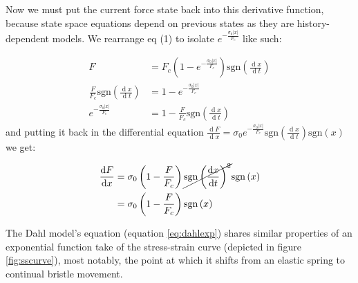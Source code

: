 \documentclass[12pt]{article}
\newcommand{\diff}{\ensuremath{\operatorname{d}\!}}
\begin{document}
\noindent
Now we must put the current force state back into this derivative function, because state space equations depend on previous states as they are history-dependent models. We rearrange eq (1) to isolate $e^{-\frac{\sigma_{0}|x|}{F_{c}}}$ like such:

\begin{align}
    F&=F_{c}\left(1-e^{-\frac{ \sigma_{0}|x| }{ F_{c} }}\right)\mathrm{sgn}\left(\frac{\diff x}{\diff t}\right) \\
    \frac{F}{F_{c}} \mathrm{sgn}\left(\frac{\diff x}{\diff t}\right) &= 1-e^{-\frac{\sigma_{0}|x|}{F_{c}}} \\
    e^{-\frac{\sigma_{0}|x|}{F_{c}}} &= 1 - \frac{F}{F_{c}} \mathrm{sgn}\left(\frac{\diff x}{\diff t}\right)
\end{align}
and putting it back in the differential equation $\frac{\diff F}{\diff x} = \sigma_{0}e^{-\frac{\sigma_{0}|x|}{F_{c}}}\mathrm{sgn}\left(\frac{\diff x}{\diff t}\right)\mathrm{sgn}\left(x\right)$ we get:

\begin{align}
    \frac{\diff F}{\diff x} &= \sigma_{0}\left(1-\frac{F}{F_{c}}\right)\cancel{\mathrm{sgn}\left(\frac{\diff x}{\diff t}\right)^{2}}\mathrm{sgn}\left(x\right) \\
    &=\sigma_{0}\left(1-\frac{F}{F_{c}}\right)\mathrm{sgn}\left(x\right)
\end{align}




The Dahl model's equation (equation \ref{eq:dahlexp}) shares similar properties of an exponential function take of the stress-strain curve (depicted in figure \ref{fig:sscurve}), most notably, the point at which it shifts from an elastic spring to continual bristle movement.

\end{document}
